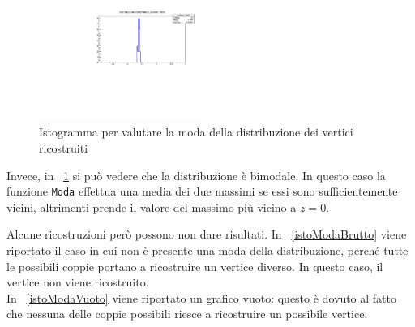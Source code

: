 \documentclass[11pt,a4paper]{article}
\begin{document}
\begin{figure}[b]
    \centering
    \includegraphics[width=0.47\textwidth]{Immagini/hzReco_medio_1000.pdf}
    \vspace{-5pt}
    \caption{Istogramma per valutare la moda della distribuzione dei vertici ricostruiti}
    \label{istoModaMedio}
    \vspace{-10pt}
\end{figure}
\noindent Invece, in \figurename~\ref{istoModaMedio} si può vedere che la distribuzione è bimodale. In questo caso la funzione \lstinline{Moda} effettua una media dei due massimi se essi sono sufficientemente vicini, altrimenti prende il valore del massimo più vicino a $z = 0$.

\noindent Alcune ricostruzioni però possono non dare risultati. In \figurename~\ref{istoModaBrutto} viene riportato il caso in cui non è presente una moda della distribuzione, perché tutte le possibili coppie portano a ricostruire un vertice diverso. In questo caso, il vertice non viene ricostruito.\\
In \figurename~\ref{istoModaVuoto} viene riportato un grafico vuoto: questo è dovuto al fatto che nessuna delle coppie possibili riesce a ricostruire un possibile vertice.
\end{document}
